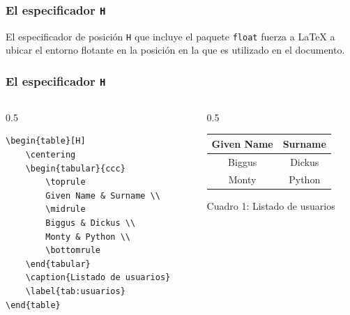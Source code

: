 \documentclass[12pt,aspectratio=169,ignorenonframetext]{ltxbeamer}
\begin{document}
\begin{frame}
\frametitle{El especificador \texttt{H}}

El especificador de posición \texttt{H} que incluye el paquete \texttt{float} fuerza a {\lmr\LaTeX} a ubicar el entorno flotante en la posición en la que es utilizado en el documento.
\end{frame}






\begin{frame}[fragile]
\frametitle{El especificador \texttt{H}}

\begin{columns}
    \begin{column}{0.5\textwidth}
        \begin{verbatim}
\begin{table}[H]
    \centering
    \begin{tabular}{ccc}
        \toprule
        Given Name & Surname \\
        \midrule
        Biggus & Dickus \\
        Monty & Python \\
        \bottomrule
    \end{tabular}
    \caption{Listado de usuarios}
    \label{tab:usuarios}
\end{table}
        \end{verbatim}
    \end{column}
    {\color{gray}\vline}
    \begin{column}{0.5\textwidth}
        \lmr
        \centering
        \begin{tabular}{cc}
            \toprule
            Given Name & Surname \\
            \midrule
            Biggus & Dickus \\
            Monty & Python \\
            \bottomrule
        \end{tabular}

        \medskip
        \begingroup
        \centering
        Cuadro 1: Listado de usuarios\par
        \endgroup
    \end{column}
\end{columns}
\end{frame}
\end{document}

